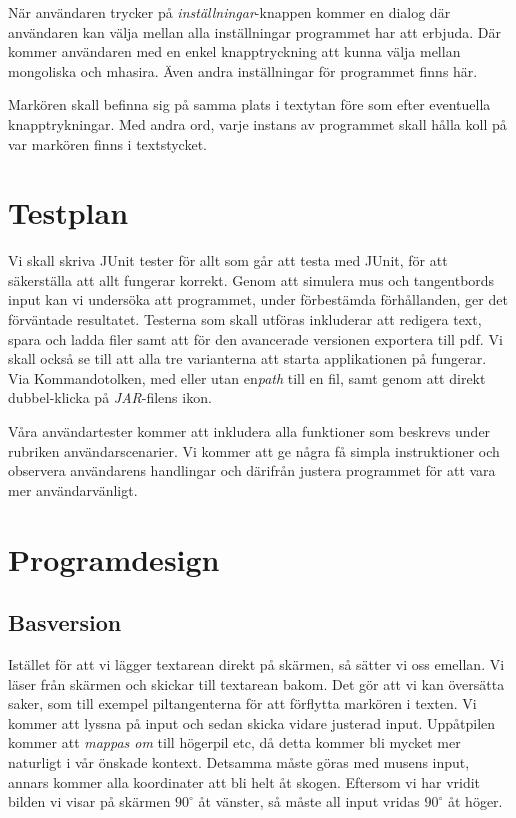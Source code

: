 \documentclass[a4paper,11p,twoside]{report}
\begin{document}
När användaren trycker på \emph{inställningar}-knappen kommer en dialog där användaren kan välja mellan alla inställningar programmet har att erbjuda. Där kommer användaren med en enkel knapptryckning att kunna välja mellan mongoliska och mhasira. Även andra inställningar för programmet finns här.

Markören skall befinna sig på samma plats i textytan före som efter eventuella knapptrykningar. Med andra ord, varje instans av programmet skall hålla koll på var markören finns i textstycket.

\section{Testplan}
Vi skall skriva JUnit tester för allt som går att testa med JUnit, för att säkerställa att allt fungerar korrekt. Genom att simulera mus och tangentbords input kan vi undersöka att programmet, under förbestämda förhållanden, ger det förväntade resultatet. Testerna som skall utföras inkluderar att redigera text, spara och ladda filer samt att för den avancerade versionen exportera till pdf. Vi skall också se till att alla tre varianterna att starta applikationen på fungerar. Via Kommandotolken, med eller utan en\emph{path} till en fil, samt genom att direkt dubbel-klicka på \emph{JAR}-filens ikon.

Våra användartester kommer att inkludera alla funktioner som beskrevs under rubriken användarscenarier. Vi kommer att ge några få simpla instruktioner och observera användarens handlingar och därifrån justera programmet för att vara mer användarvänligt.

\section{Programdesign}
\subsection{Basversion}
Istället för att vi lägger textarean direkt på skärmen, så sätter vi oss emellan. Vi läser från skärmen och skickar till textarean bakom.
Det gör att vi kan översätta saker, som till exempel piltangenterna för att förflytta markören i texten. Vi kommer att lyssna på input och sedan skicka vidare justerad input. Uppåtpilen kommer att \emph{mappas om} till högerpil etc, då detta kommer bli mycket mer naturligt i vår önskade kontext. Detsamma måste göras med musens input, annars kommer alla koordinater att bli helt åt skogen. Eftersom vi har vridit bilden vi visar på skärmen $90^\circ$ åt vänster, så måste all input vridas $90^\circ$ åt höger.
\end{document}

